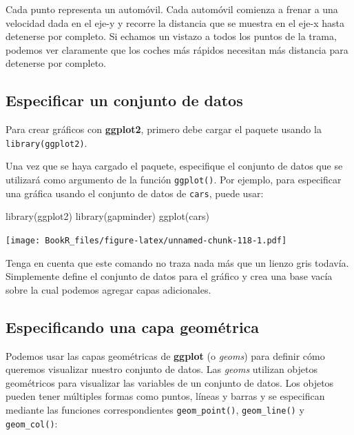 \documentclass[
]{book}
\newenvironment{Shaded}{\begin{snugshade}}{\end{snugshade}}
\newcommand{\FunctionTok}[1]{\textcolor[rgb]{0.00,0.00,0.00}{#1}}
\newcommand{\NormalTok}[1]{#1}
\begin{document}
Cada punto representa un automóvil. Cada automóvil comienza a frenar a una velocidad dada en el eje-y y recorre la distancia que se muestra en el eje-x hasta detenerse por completo. Si echamos un vistazo a todos los puntos de la trama, podemos ver claramente que los coches más rápidos necesitan más distancia para detenerse por completo.

\hypertarget{especificar-un-conjunto-de-datos}{%
\subsection{Especificar un conjunto de datos}\label{especificar-un-conjunto-de-datos}}

Para crear gráficos con \textbf{ggplot2}, primero debe cargar el paquete usando la \texttt{library(ggplot2)}.

Una vez que se haya cargado el paquete, especifique el conjunto de datos que se utilizará como argumento de la función \texttt{ggplot()}. Por ejemplo, para especificar una gráfica usando el conjunto de datos de \texttt{cars}, puede usar:

\begin{Shaded}
\begin{Highlighting}[]
\FunctionTok{library}\NormalTok{(ggplot2)}
\FunctionTok{library}\NormalTok{(gapminder)}
\FunctionTok{ggplot}\NormalTok{(cars)}
\end{Highlighting}
\end{Shaded}

\texttt{[image: BookR\_files/figure-latex/unnamed-chunk-118-1.pdf]}

Tenga en cuenta que este comando no traza nada más que un lienzo gris todavía. Simplemente define el conjunto de datos para el gráfico y crea una base vacía sobre la cual podemos agregar capas adicionales.

\hypertarget{especificando-una-capa-geomuxe9trica}{%
\subsection{Especificando una capa geométrica}\label{especificando-una-capa-geomuxe9trica}}

Podemos usar las capas geométricas de \textbf{ggplot} (o \emph{geoms}) para definir cómo queremos visualizar nuestro conjunto de datos. Las \emph{geoms} utilizan objetos geométricos para visualizar las variables de un conjunto de datos. Los objetos pueden tener múltiples formas como puntos, líneas y barras y se especifican mediante las funciones correspondientes \texttt{geom\_point()}, \texttt{geom\_line()} y \texttt{geom\_col()}:
\end{document}
